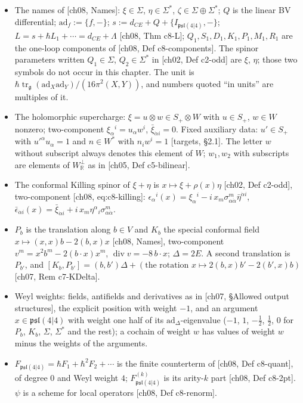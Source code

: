 \begin{definition}[Names]
\label{def:o-names}
\begin{itemize}
\item The names of [ch08, Names]: $\xi\in\Sigma$, $\eta\in\Sigma^*$, $\zeta\in\Sigma\oplus\Sigma^*$; $Q$ is the linear BV differential; $\mathrm{ad}_f:=\{f,-\}$; $s:=d_{CE}+Q+\{I_{\mathfrak{psl}(4|4)},-\}$; $L=s+\hbar L_1+\cdots=d_{CE}+\Lambda$ [ch08, Thm c8-L]; $Q_1,S_1,D_1,K_1,P_1,M_1,R_1$ are the one-loop components of [ch08, Def c8-components]. The spinor parameters written $Q_1\in\Sigma$, $Q_2\in\Sigma^*$ in [ch02, Def c2-odd] are $\xi$, $\eta$; those two symbols do not occur in this chapter. The unit is $\hbar\operatorname{tr}_{\mathfrak g}(\mathrm{ad}_X\mathrm{ad}_Y)/(16\pi^2(X,Y))$, and numbers quoted ``in units'' are multiples of it.
\item The holomorphic supercharge: $\xi=u\otimes w\in S_+\otimes W$ with $u\in S_+$, $w\in W$ nonzero; two-component $\xi_\alpha{}^i=u_\alpha w^i$, $\bar\xi_{\dot\alpha i}=0$. Fixed auxiliary data: $u'\in S_+$ with $u'^\alpha u_\alpha=1$ and $n\in W^*$ with $n_iw^i=1$ [targets, §2.1]. The letter $w$ without subscript always denotes this element of $W$; $w_1,w_2$ with subscripts are elements of $W_{\mathbb R}^\perp$ as in [ch05, Def c5-bilinear].
\item The conformal Killing spinor of $\xi+\eta$ is $x\mapsto\xi+\rho(x)\eta$ [ch02, Def c2-odd], two-component [ch08, eq:c8-killing]: $\epsilon_\alpha{}^i(x)=\xi_\alpha{}^i-i\,x_m\sigma^m_{\alpha\dot\alpha}\bar\eta^{\dot\alpha i}$, $\bar\epsilon_{\dot\alpha i}(x)=\bar\xi_{\dot\alpha i}+i\,x_m\eta^\alpha{}_i\sigma^m_{\alpha\dot\alpha}$.
\item $P_b$ is the translation along $b\in V$ and $K_b$ the special conformal field $x\mapsto(x,x)b-2(b,x)x$ [ch08, Names], two-component $v^m=x^2b^m-2(b\cdot x)x^m$, $\operatorname{div}v=-8\,b\cdot x$; $\Delta=2E$. A second translation is $P_{b'}$, and $[K_b,P_{b'}]=(b,b')\Delta+(\text{the rotation }x\mapsto2(b,x)b'-2(b',x)b)$ [ch07, Rem c7-KDelta].
\item Weyl weights: fields, antifields and derivatives as in [ch07, §Allowed output structures], the explicit position with weight $-1$, and an argument $x\in\mathfrak{psl}(4|4)$ with weight one half of its $\mathrm{ad}_\Delta$-eigenvalue ($-1$, $1$, $-\tfrac12$, $\tfrac12$, $0$ for $P_b$, $K_b$, $\Sigma$, $\Sigma^*$ and the rest); a cochain of weight $w$ has values of weight $w$ minus the weights of the arguments.
\item $F_{\mathfrak{psl}(4|4)}=\hbar F_1+\hbar^2F_2+\cdots$ is the finite counterterm of [ch08, Def c8-quant], of degree $0$ and Weyl weight $4$; $F^{(k)}_{\mathfrak{psl}(4|4)}$ is its arity-$k$ part [ch08, Def c8-2pt]. $\psi$ is a scheme for local operators [ch08, Def c8-renorm].

\end{itemize}
\end{definition}
